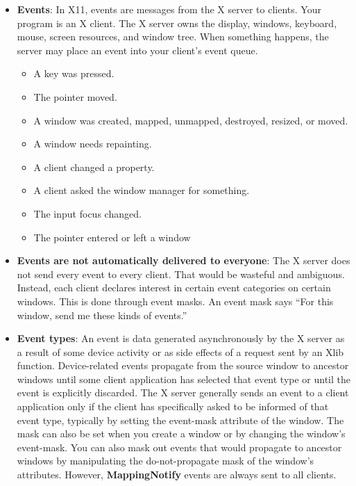 \documentclass{report}
\begin{document}
    \pagebreak 
    \begin{itemize}
        \item \textbf{Events}: In X11, events are messages from the X server to clients.
            \bigbreak \noindent 
            Your program is an X client. The X server owns the display, windows, keyboard, mouse, screen resources, and window tree. When something happens, the server may place an event into your client’s event queue.
            \begin{itemize}
                \item A key was pressed.
                \item The pointer moved.
                \item A window was created, mapped, unmapped, destroyed, resized, or moved.
                \item A window needs repainting.
                \item A client changed a property.
                \item A client asked the window manager for something.
                \item The input focus changed.
                \item The pointer entered or left a window
            \end{itemize}
        \item \textbf{Events are not automatically delivered to everyone}: The X server does not send every event to every client. That would be wasteful and ambiguous. Instead, each client declares interest in certain event categories on certain windows. This is done through event masks. An event mask says “For this window, send me these kinds of events.”
        \item \textbf{Event types}: An event is data generated asynchronously by the X server as a result of some device activity or as side effects of a request sent by an Xlib function. Device-related events propagate from the source window to ancestor windows until some client application has selected that event type or until the event is explicitly discarded. The X server generally sends an event to a client application only if the client has specifically asked to be informed of that event type, typically by setting the event-mask attribute of the window. The mask can also be set when you create a window or by changing the window’s event-mask. You can also mask out events that would propagate to ancestor windows by manipulating the do-not-propagate mask of the window’s attributes. However, \textbf{MappingNotify} events are always sent to all clients.

\end{itemize}
\end{document}
